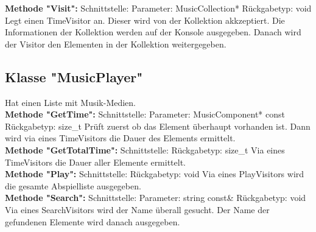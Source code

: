 \documentclass[12pt,a4paper]{article}
\begin{document}
\textbf {Methode "Visit": } 
\newline
Schnittstelle: 
\newline
Parameter: MusicCollection*
\newline
Rückgabetyp: void
\newline
Legt einen TimeVisitor an. Dieser wird von der Kollektion akkzeptiert. Die Informationen der Kollektion werden auf der Konsole ausgegeben. Danach wird der Visitor den Elementen in der Kollektion weitergegeben.
\\

\subsection {Klasse "MusicPlayer"}
Hat einen Liste mit Musik-Medien.
\\

\textbf {Methode "GetTime": } 
\newline
Schnittstelle: 
\newline
Parameter: MusicComponent* const
\newline
Rückgabetyp: size\_t
\newline
Prüft zuerst ob das Element überhaupt vorhanden ist. Dann wird via eines TimeVisitors die Dauer des Elements ermittelt.
\\

\textbf {Methode "GetTotalTime": } 
\newline
Schnittstelle: 
\newline
Rückgabetyp: size\_t
\newline
Via eines TimeVisitors die Dauer aller Elemente ermittelt.
\\

\textbf {Methode "Play": } 
\newline
Schnittstelle: 
\newline
Rückgabetyp: void
\newline
Via eines PlayVisitors wird die gesamte Abspielliste ausgegeben.
\\

\textbf {Methode "Search": } 
\newline
Schnittstelle: 
\newline
Parameter: string const\&
\newline
Rückgabetyp: void
\newline
Via eines SearchVisitors wird der Name überall gesucht. Der Name der gefundenen Elemente wird danach ausgegeben.
\\

\newpage
\end{document}
